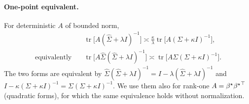 {\paragraph{One-point equivalent.}
For deterministic $A$ of bounded norm,
\begin{equation}
\begin{aligned}
&\operatorname{tr}\big[A(\hat\Sigma+\lambda I)^{-1}\big]\asymp\frac{\kappa}{\lambda}\operatorname{tr}\big[A(\Sigma+\kappa I)^{-1}\big],\\
\text{equivalently}\quad
&\operatorname{tr}\big[A\hat\Sigma(\hat\Sigma+\lambda I)^{-1}\big]\asymp\operatorname{tr}\big[A\Sigma(\Sigma+\kappa I)^{-1}\big].
\end{aligned}
\label{eq:app-one-point-de}
\end{equation}
The two forms are equivalent by $\hat\Sigma(\hat\Sigma+\lambda I)^{-1}=I-\lambda(\hat\Sigma+\lambda I)^{-1}$
and $I-\kappa(\Sigma+\kappa I)^{-1}=\Sigma(\Sigma+\kappa I)^{-1}$.  We use
them also for rank-one $A={\beta^{\star}}{{\beta^{\star}}}^\top$ (quadratic forms), for which
the same equivalence holds without normalization.

}
